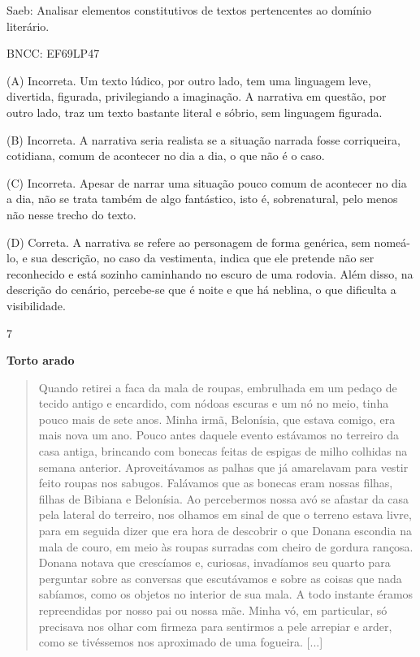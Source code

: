 Saeb: Analisar elementos constitutivos de textos pertencentes ao domínio
literário.

BNCC: EF69LP47

(A) Incorreta. Um texto lúdico, por outro lado, tem uma linguagem leve,
divertida, figurada, privilegiando a imaginação. A narrativa em questão,
por outro lado, traz um texto bastante literal e sóbrio, sem linguagem
figurada.

(B) Incorreta. A narrativa seria realista se a situação narrada fosse
corriqueira, cotidiana, comum de acontecer no dia a dia, o que não é o
caso.

(C) Incorreta. Apesar de narrar uma situação pouco comum de acontecer no
dia a dia, não se trata também de algo fantástico, isto é, sobrenatural,
pelo menos não nesse trecho do texto.

(D) Correta. A narrativa se refere ao personagem de forma genérica, sem
nomeá-lo, e sua descrição, no caso da vestimenta, indica que ele
pretende não ser reconhecido e está sozinho caminhando no escuro de uma
rodovia. Além disso, na descrição do cenário, percebe-se que é noite e
que há neblina, o que dificulta a visibilidade.

\num{7}

\textbf{Torto arado}

\begin{quote}
Quando retirei a faca da mala de roupas, embrulhada em um pedaço de
tecido antigo e encardido, com nódoas escuras e um nó no meio, tinha
pouco mais de sete anos. Minha irmã, Belonísia, que estava comigo, era
mais nova um ano. Pouco antes daquele evento estávamos no terreiro da
casa antiga, brincando com bonecas feitas de espigas de milho colhidas
na semana anterior. Aproveitávamos as palhas que já amarelavam para
vestir feito roupas nos sabugos. Falávamos que as bonecas eram nossas
filhas, filhas de Bibiana e Belonísia. Ao percebermos nossa avó se
afastar da casa pela lateral do terreiro, nos olhamos em sinal de que o
terreno estava livre, para em seguida dizer que era hora de descobrir o
que Donana escondia na mala de couro, em meio às roupas surradas com
cheiro de gordura rançosa. Donana notava que crescíamos e, curiosas,
invadíamos seu quarto para perguntar sobre as conversas que escutávamos
e sobre as coisas que nada sabíamos, como os objetos no interior de sua
mala. A todo instante éramos repreendidas por nosso pai ou nossa mãe.
Minha vó, em particular, só precisava nos olhar com firmeza para
sentirmos a pele arrepiar e arder, como se tivéssemos nos aproximado de
uma fogueira. {[}...{]}
\end{quote}

